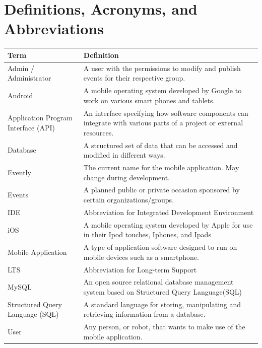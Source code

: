 \documentclass[letterpaper, 10pt,titlepage]{article}
\begin{document}
\section{Definitions, Acronyms, and Abbreviations }
\begin{table}[ht]
\begin{tabular}{| l | p{9cm} |}
\hline
\textbf{Term} & \textbf{Definition} \\ \hline
Admin / Administrator & A user with the permissions to modify and publish events for their respective group. \\ \hline
Android & A mobile operating system developed by Google to work on various smart phones and tablets.\\ \hline
Application Program Interface (API) & An interface specifying how software components can integrate with various parts of a project or external resources. \\ \hline
Database & A structured set of data that can be accessed and modified in different ways.\\ \hline
Evently & The current name for the mobile application. May change during development. \\ \hline
Events & A planned public or private occasion sponsored by certain organizations/groups. \\ \hline
IDE & Abbreviation for Integrated Development Environment \\ \hline
iOS & A mobile operating system developed by Apple for use in their Ipod touches, Iphones, and Ipads \\ \hline
Mobile Application & A type of application software designed to run on mobile devices such as a smartphone. \\ \hline
LTS & Abbreviation for Long-term Support \\ \hline
MySQL & An open source relational database management system based on Structured Query Language(SQL) \\ \hline
Structured Query Language (SQL) & A standard language for storing, manipulating and retrieving information from a database. \\ \hline
User & Any person, or robot, that wants to make use of the mobile application. \\ \hline
\end{tabular}
\end{table}                                                


\end{document}
